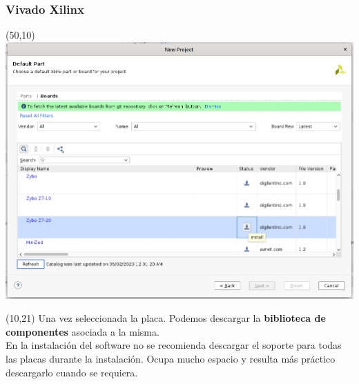 \documentclass[aspectratio=169]{beamer}
\begin{document}
\begin{frame}[fragile,t]
    \frametitle{Vivado Xilinx}
    \begin{textblock}{75}(50,10) \includegraphics[scale=0.27]{img/vivado/09_install_board.png} \end{textblock}
    \begin{textblock}{38}(10,21) \small
     Una vez seleccionada la placa. Podemos descargar la \textbf{biblioteca de componentes} asociada a la misma.\\
     \bigskip
     \textcolor{verdeuca}{En la instalación del software no se recomienda descargar el soporte para todas las placas durante la instalación. Ocupa mucho espacio y resulta más práctico descargarlo cuando se requiera.}
    \end{textblock}
\end{frame}
    
\end{document}
